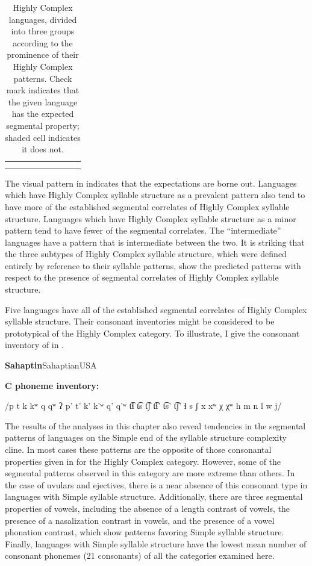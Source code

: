 \begin{table}
\begin{tabularx}{\textwidth}{lCCCCCCCC}
  &  &  &  &  &  &  &  & \\
\lspbottomrule
\end{tabularx}
\caption{\label{tab:4.16}Highly Complex languages, divided into three groups according to the prominence of their Highly Complex patterns. Check mark indicates that the given language has the expected segmental property; shaded cell indicates it does not.}
\end{table}

  The visual pattern in  indicates that the expectations are borne out. Languages which have Highly Complex syllable structure as a prevalent pattern also tend to have more of the established segmental correlates of Highly Complex syllable structure. Languages which have Highly Complex syllable structure as a minor pattern tend to have fewer of the segmental correlates. The ``intermediate'' languages have a pattern that is intermediate between the two. It is striking that the three subtypes of Highly Complex syllable structure, which were defined entirely by reference to their syllable patterns, show the predicted patterns with respect to the presence of segmental correlates of Highly Complex syllable structure.

  Five languages have all of the established segmental correlates of Highly Complex syllable structure. Their consonant inventories might be considered to be prototypical of the Highly Complex category. To illustrate, I give the consonant inventory of  in .

\ea\label{ex:4.35}
 \textbf{Sahaptin}{Sahaptian}{USA}

\textbf{C phoneme inventory:} 

/p t k kʷ q qʷ ʔ p’ t’ k’ k’ʷ q’ q’ʷ t͡ɬ t͡s t͡ʃ t͡ɬ’ t͡s’ t͡ʃ’ ɬ s ʃ x xʷ χ χʷ h m n l w j/
\z

  The results of the analyses in this chapter also reveal tendencies in the segmental patterns of languages on the Simple end of the syllable structure complexity cline. In most cases these patterns are the opposite of those consonantal properties given in  for the Highly Complex category. However, some of the segmental patterns observed in this category are more extreme than others. In the case of uvulars and ejectives, there is a near absence of this consonant type in languages with Simple syllable structure. Additionally, there are three segmental properties of vowels, including the absence of a length contrast of vowels, the presence of a nasalization contrast in vowels, and the presence of a vowel phonation contrast, which show patterns favoring Simple syllable structure. Finally, languages with Simple syllable structure have the lowest mean number of consonant phonemes (21 consonants) of all the categories examined here.

